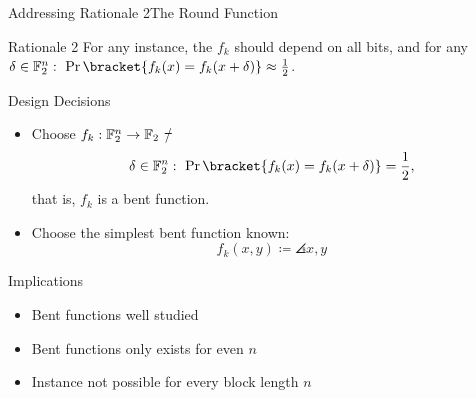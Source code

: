 \begin{frame}{Addressing Rationale 2}{The Round Function}
    \vspace{-60pt}
    \begin{minipage}{0.985\textwidth}
    \begin{exampleblock}{Rationale 2}
        For any instance, the $f_{k}$ should depend on all bits, and for any $\delta \in \F_2^n:\ \Pr\bracket{f_k(x) = f_k(x + \delta)} \approx \frac{1}{2}$.
    \end{exampleblock}
    \end{minipage}

    \begin{minipage}[t][85pt][t]{0.47\textwidth}
        \begin{block}{Design Decisions}
            \begin{itemize}
                \item Choose $f_k : \mathbb{F}_2^n \to \mathbb{F}_2$ \st/
                      \begin{equation*}
                          \delta \in \F_2^n:\ \Pr\bracket{f_k(x) = f_k(x + \delta)} = \frac{1}{2},
                      \end{equation*}
                      that is, $f_k$ is a bent function.
                \item Choose the simplest bent function known:
                    \begin{equation*}
                        f_k(x, y) \coloneqq \angles{x, y}
                    \end{equation*}
            \end{itemize}
        \end{block}
    \end{minipage}
    \hfill
    \begin{minipage}[t][85pt][t]{0.47\textwidth}
        \begin{block}{Implications}
            \begin{itemize}
                \item Bent functions well studied\\[5pt]
                \item Bent functions only exists for even $n$\\[5pt]
                \item Instance not possible for every block length $n$
            \end{itemize}
        \end{block}
    \end{minipage}

\end{frame}
